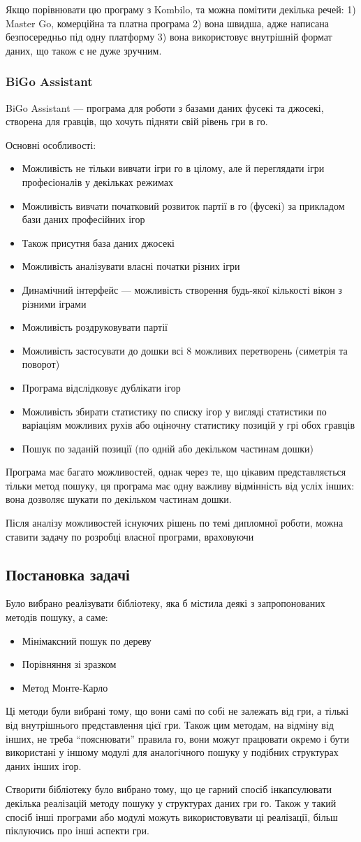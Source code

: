 Якщо порівнювати цю програму з Kombilo, та можна помітити декілька речей: 1) Master Go, комерційна та платна програма 2) вона швидша, адже написана безпосередньо під одну платформу 3) вона використовує внутрішній формат даних, що також є не дуже зручним.
\subsubsection{BiGo Assistant}
BiGo Assistant --- програма для роботи з базами даних фусекі та джосекі, створена для гравців, що хочуть підняти свій рівень гри в го.

Основні особливості:
\begin{itemize}
	\item Можливість не тільки вивчати ігри го в цілому, але й переглядати ігри професіоналів у декільках режимах
	\item Можливість вивчати початковий розвиток партії в го (фусекі) за прикладом бази даних професійних ігор
	\item Також присутня база даних джосекі
	\item Можливість аналізувати власні початки різних ігри
	\item Динамічний інтерфейс --- можливість створення будь-якої кількості вікон з різними іграми
	\item Можливість роздруковувати партії
	\item Можливість застосувати до дошки всі 8 можливих перетворень (симетрія та поворот)
	\item Програма відслідковує дублікати ігор
	\item Можливість збирати статистику по списку ігор у вигляді статистики по варіаціям можливих рухів або оціночну статистику позицій у грі обох гравців
	\item Пошук по заданій позиції (по одній або декільком частинам дошки)
\end{itemize}

Програма має багато можливостей, однак через те, що цікавим представляється тільки метод пошуку, ця програма має одну важливу відмінність від усліх інших: вона дозволяє шукати по декільком частинам дошки.

Після аналізу можливостей існуючих рішень по темі дипломної роботи, можна ставити задачу по розробці власної програми, враховуючи 
\subsection{Постановка задачі}
Було вибрано реалізувати бібліотеку, яка б містила деякі з запропонованих методів пошуку, а саме:
\begin{itemize}
	\item Мінімаксний пошук по дереву
	\item Порівняння зі зразком
	\item Метод Монте-Карло
\end{itemize}
Ці методи були вибрані тому, що вони самі по собі не залежать від гри, а тількі від внутрішнього представлення цієї гри. Також цим методам, на відміну від інших, не треба ``пояснювати'' правила го, вони можут працювати окремо і бути використані у іншому модулі для аналогічного пошуку у подібних структурах даних інших ігор.

Створити бібліотеку було вибрано тому, що це гарний спосіб інкапсулювати декілька реалізацій методу пошуку у структурах даних гри го. Також у такий спосіб інші програми або модулі можуть використовувати ці реалізації, більш піклуючись про інші аспекти гри.